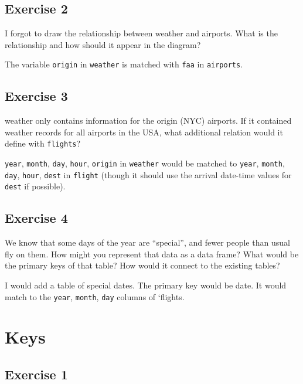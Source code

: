 \documentclass[]{book}
\theoremstyle{plain}
\theoremstyle{remark}
\theoremstyle{definition}
\theoremstyle{definition}
\theoremstyle{definition}
\theoremstyle{remark}
\begin{document}
\hypertarget{exercise-2-25}{%
\subsection{Exercise 2}\label{exercise-2-25}}

I forgot to draw the relationship between weather and airports. What is
the relationship and how should it appear in the diagram?

The variable \texttt{origin} in \texttt{weather} is matched with
\texttt{faa} in \texttt{airports}.

\hypertarget{exercise-3-22}{%
\subsection{Exercise 3}\label{exercise-3-22}}

weather only contains information for the origin (NYC) airports. If it
contained weather records for all airports in the USA, what additional
relation would it define with \texttt{flights}?

\texttt{year}, \texttt{month}, \texttt{day}, \texttt{hour},
\texttt{origin} in \texttt{weather} would be matched to \texttt{year},
\texttt{month}, \texttt{day}, \texttt{hour}, \texttt{dest} in
\texttt{flight} (though it should use the arrival date-time values for
\texttt{dest} if possible).

\hypertarget{exercise-4-17}{%
\subsection{Exercise 4}\label{exercise-4-17}}

We know that some days of the year are ``special'', and fewer people
than usual fly on them. How might you represent that data as a data
frame? What would be the primary keys of that table? How would it
connect to the existing tables?

I would add a table of special dates. The primary key would be date. It
would match to the \texttt{year}, \texttt{month}, \texttt{day} columns
of `flights.

\hypertarget{keys}{%
\section{Keys}\label{keys}}

\hypertarget{exercise-1-27}{%
\subsection{Exercise 1}\label{exercise-1-27}}
\end{document}
